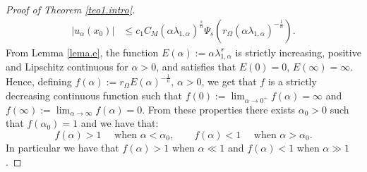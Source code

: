 \documentclass[12pt,reqno]{amsart}
\theoremstyle{definition}
\theoremstyle{remark}
\numberwithin{equation}{section}
\begin{document}
\begin{proof}[Proof of Theorem \ref{teo1.intro}]
\begin{align}
|u_\alpha(x_0)|&\leq c_1 C_M \left( \alpha \lambda_{1,\alpha} \right)^\frac{s}{n} \Psi_s \left(   r_\Omega \left( \alpha \lambda_{1,\alpha}\right)^{-\frac{1}{n}}  \right).
\end{align}
\noindent From Lemma \ref{lema.e}, the function $E(\alpha):=\alpha \lambda_{1,\alpha}^s$ is strictly increasing, positive and Lipschitz continuous for $\alpha>0$, and satisfies that $E(0)=0$, $E(\infty)=\infty$.  Hence, defining $f(\alpha):=r_\Omega E(\alpha)^{-\frac{1}{n}}$, $\alpha>0$,  we get that $f$ is a  strictly decreasing continuous function such that $f(0):=\lim_{\alpha\to 0^+}f(\alpha)=\infty$ and $f(\infty):=\lim_{\alpha\to \infty} f(\alpha)=0$. From these properties there exists $\alpha_0>0$ such that $f(\alpha_0)=1$ and we have that:
$$
f(\alpha)> 1 \quad \text{ when } \alpha< \alpha_0, \qquad f(\alpha)<1 \quad \text{ when } \alpha>\alpha_0.
$$
In particular we have that $f(\alpha)> 1$ when $\alpha\ll1$ and $f(\alpha)<  1$ when $\alpha\gg1$.

\medskip


\end{proof}
\end{document}
